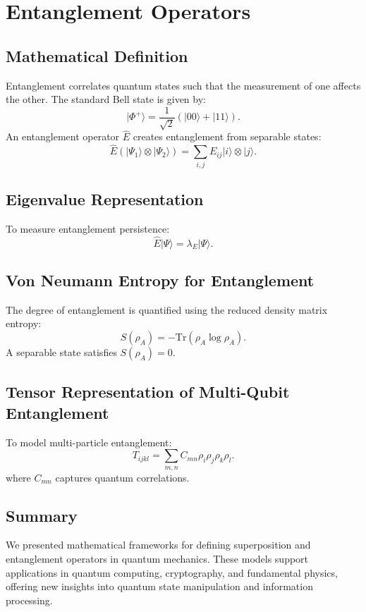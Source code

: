 \documentclass{article}
\theoremstyle{plain}
\begin{document}
\section{Entanglement Operators}

\subsection{Mathematical Definition}
Entanglement correlates quantum states such that the measurement of one affects the other. The standard Bell state is given by:
\begin{equation}
    |\Phi^+\rangle = \frac{1}{\sqrt{2}} (|00\rangle + |11\rangle).
\end{equation}
An entanglement operator $\hat{E}$ creates entanglement from separable states:
\begin{equation}
    \hat{E} (|\Psi_1\rangle \otimes |\Psi_2\rangle) = \sum_{i, j} E_{ij} |i\rangle \otimes |j\rangle.
\end{equation}

\subsection{Eigenvalue Representation}
To measure entanglement persistence:
\begin{equation}
    \hat{E} |\Psi\rangle = \lambda_E |\Psi\rangle.
\end{equation}

\subsection{Von Neumann Entropy for Entanglement}
The degree of entanglement is quantified using the reduced density matrix entropy:
\begin{equation}
    S(\rho_A) = - \text{Tr}(\rho_A \log \rho_A).
\end{equation}
A separable state satisfies $S(\rho_A) = 0$.

\subsection{Tensor Representation of Multi-Qubit Entanglement}
To model multi-particle entanglement:
\begin{equation}
    T_{ijkl} = \sum_{m,n} C_{mn} \rho_i \rho_j \rho_k \rho_l.
\end{equation}
where $C_{mn}$ captures quantum correlations.

\subsection{Summary}
We presented mathematical frameworks for defining superposition and entanglement operators in quantum mechanics. These models support applications in quantum computing, cryptography, and fundamental physics, offering new insights into quantum state manipulation and information processing.
\end{document}
